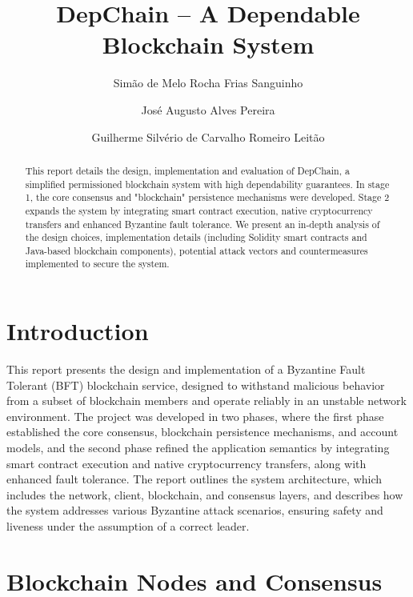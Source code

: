 \documentclass[runningheads]{llncs}
\begin{document}
\title{DepChain -- A Dependable Blockchain System}
\author{Simão de Melo Rocha Frias Sanguinho \and José Augusto Alves Pereira \and Guilherme Silvério de Carvalho Romeiro Leitão}
\maketitle

\begin{abstract}
    This report details the design, implementation and evaluation of DepChain, a simplified permissioned blockchain system with high dependability guarantees. In stage 1, the core consensus and "blockchain" persistence mechanisms were developed. Stage 2 expands the system by integrating smart contract execution, native cryptocurrency transfers and enhanced Byzantine fault tolerance. We present an in-depth analysis of the design choices, implementation details (including Solidity smart contracts and Java-based blockchain components), potential attack vectors and countermeasures implemented to secure the system.

\end{abstract}

\section{Introduction}
This report presents the design and implementation of a Byzantine Fault Tolerant (BFT) blockchain service, designed to withstand malicious behavior from a subset of blockchain members and operate reliably in an unstable network environment. The project was developed in two phases, where the first phase established the core consensus, blockchain persistence mechanisms, and account models, and the second phase refined the application semantics by integrating smart contract execution and native cryptocurrency transfers, along with enhanced fault tolerance. The report outlines the system architecture, which includes the network, client, blockchain, and consensus layers, and describes how the system addresses various Byzantine attack scenarios, ensuring safety and liveness under the assumption of a correct leader.

\section{Blockchain Nodes and Consensus}
\end{document}
